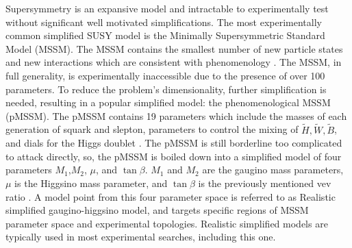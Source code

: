 Supersymmetry is an expansive model and intractable to experimentally test without significant well motivated simplifications. The most experimentally common simplified SUSY model is the Minimally Supersymmetric Standard Model (MSSM). The MSSM contains the smallest number of new particle states and new interactions which are consistent with phenomenology \cite{Baer:2007izw}. The MSSM, in full generality, is experimentally inaccessible due to the presence of over 100 parameters. To reduce the problem's dimensionality, further simplification is needed, resulting in a popular simplified model: the phenomenological MSSM (pMSSM). The pMSSM contains 19 parameters which include the masses of each generation of squark and slepton, parameters to control the mixing of $\tilde{H}, \tilde{W}, \tilde{B}$, and dials for the Higgs doublet \cite{MSSMWorkingGroup:1998fiq}.  The pMSSM is still borderline too complicated to attack directly, so, the pMSSM is boiled down into a simplified model of four parameters $M_1$,$M_2$, $\mu$, and $\tan\beta$. $M_1$ and $M_2$ are the gaugino mass parameters, $\mu$ is the Higgsino mass parameter, and $\tan\beta$ is the previously mentioned vev ratio \cite{Fuks_2018}.  A model point from this four parameter space is referred to as Realistic simplified gaugino-higgsino model, and targets specific regions of MSSM parameter space and experimental topologies. Realistic simplified models are typically used in most experimental searches, including this one.

